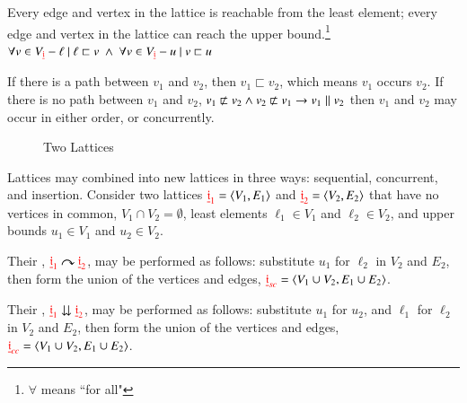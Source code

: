 \pn Every edge and vertex in the lattice is reachable from the least element; every edge and vertex in the lattice can reach the upper bound.\footnote{$\forall$ means ``for all"}  
\(\forall v\in V_{ {\color{red}\underline{\mathbf{\mathfrak{i}}}}}-\ell~\vert~\ell\sqsubset v
\ \wedge\ \forall v\in V_{ {\color{red}\underline{\mathbf{\mathfrak{i}}}}}- u~\vert~ v\sqsubset u\)

\pn If there is a path between 
$v_1$ and $v_2$, then $v_{1}\sqsubset v_{2}$, which means $v_1$ occurs  $v_2$.
If there is no path between $v_1$ and $v_2$, 
\(v_{1}\nsqsubset v_{2} \wedge v_{2}\nsqsubset v_{1} \rightarrow v_{1}\parallel v_{2}\)
then  $v_1$ and $v_2$ may occur in either order, or concurrently.

\pagebreak 
\setlength{\unitlength}{0.75pt}
\renewcommand{\nodetextscalefactor}{0.75} %

\begin{figure}
\caption{Two Lattices} %
\label{fig:twolattices}
\end{figure}

\pn Lattices may combined into new lattices in three ways:  sequential, concurrent, and insertion.
Consider two lattices $ {\color{red}\underline{\mathbf{\mathfrak{i}}}_{1}}=\langle V_{1},E_{1}\rangle$ and $ {\color{red}\underline{\mathbf{\mathfrak{i}}}_{2}}=\langle V_{2},E_{2}\rangle$ 
that have no vertices in common, $V_{1}\cap V_{2} = \emptyset$, 
least elements $\ell_{1}\in V_{1}$ and $\ell_{2}\in V_{2}$, 
and upper bounds $u_{1}\in V_{1}$ and $u_{2}\in V_{2}$.

\pn Their ,
$ {\color{red}\underline{\mathbf{\mathfrak{i}}}_{1}}\curvearrowright {\color{red}\underline{\mathbf{\mathfrak{i}}}_{2}}$, 
may be performed as follows:  
substitute $u_1$ for $\ell_2$ in $V_2$ and $E_2$, 
then form the union of the vertices and edges, $ {\color{red}\underline{\mathbf{\mathfrak{i}}}_{sc}}=\langle V_{1}\cup V_{2},E_{1}\cup E_{2}\rangle$.

\pn Their ,
$ {\color{red}\underline{\mathbf{\mathfrak{i}}}_{1}}\downdownarrows {\color{red}\underline{\mathbf{\mathfrak{i}}}_{2}}$, may be performed as follows: 
substitute $u_1$ for $u_2$, and $\ell_1$ for $\ell_2$ in $V_2$ and $E_2$, 
then form the union of the vertices and edges, $ {\color{red}\underline{\mathbf{\mathfrak{i}}}_{cc}}=\langle V_{1}\cup V_{2},E_{1}\cup E_{2}\rangle$.

